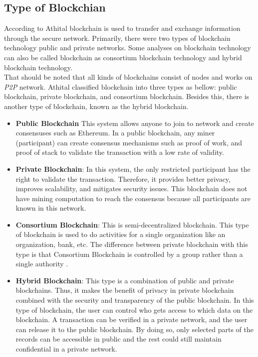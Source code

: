 \subsection{Type of Blockchian}
According to Athital\cite{Athital} blockchain is used to transfer and exchange information through the secure network. Primarily, there were two types of blockchain technology public and private networks. Some analyses on blockchain technology can also be called blockchain as consortium blockchain technology and hybrid blockchain technology. \\
That should be noted that all kinds of blockchains consist of nodes and works on \textit{P2P} network. Athital \cite{Athital} classified blockchain into three types as bellow: public blockchain, private blockchain, and consortium blockchain. Besides this, there is another type of blockchain, known as the hybrid blockchain.
\begin{itemize}
    \item \textbf{Public Blockchain}
    This system allows anyone to join to network and create consensuses such as Ethereum. In a public blockchain, any miner (participant) can create consensus mechanisms such as proof of work, and proof of stack to validate the transaction with a low rate of validity\cite{Kalra}.
    \item \textbf{Private Blockchain}: In this system, the only restricted participant has the right to validate the transaction. Therefore, it provides better privacy, improves scalability, and mitigates security issues. This blockchain does not have mining computation to reach the consensus because all participants are known in this network\cite{Kalra}. 
    \item \textbf{Consortium Blockchain}: This is semi-decentralized blockchain. This type of blockchain is used to do activities for a single organization like an organization, bank, etc. The difference between private blockchain with this type is that Consortium Blockchain is controlled by a group rather than a single authority \cite{Athital}.
    \item \textbf{Hybrid Blockchain}: This type is a combination of public and private blockchains. Thus, it makes the benefit of privacy in private blockchain combined with the security and transparency of the public blockchain. In this type of blockchain, the user can control who gets access to which data on the blockchain. A transaction can be verified in a private network, and the user can release it to the public blockchain. By doing so, only selected parts of the records can be accessible in public and the rest could still maintain confidential in a private network\cite{Athital}. 
\end{itemize}

